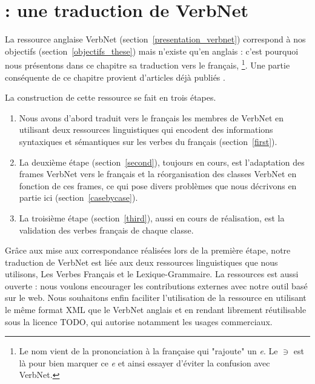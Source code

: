 \chapter{\verbenet{} : une traduction de VerbNet}
\label{ch:verbnet}

La ressource anglaise VerbNet (section~\ref{presentation_verbnet}) correspond à
nos objectifs (section~\ref{objectifs_these}) mais n'existe qu'en anglais :
c'est pourquoi nous présentons dans ce chapitre sa traduction vers le français,
\verbenet{}\footnote{Le nom vient de la prononciation à la française qui
"rajoute" un \textit{e}. Le $\ni$ est là pour bien marquer ce \textit{e} et ainsi
essayer d'éviter la confusion avec VerbNet.}. Une partie conséquente de ce
chapitre provient d'articles déjà publiés
\citep{danlos2014vers,pradet2014adapting}.

La construction de cette ressource se fait en trois étapes.
\begin{enumerate}
    \item Nous avons d'abord traduit vers le français les membres de VerbNet en
        utilisant deux ressources linguistiques qui encodent des informations
        syntaxiques et sémantiques sur les verbes du français
        (section~\ref{first}).
    \item La deuxième étape (section~\ref{second}), toujours en cours, est
        l'adaptation des frames VerbNet vers le français et la réorganisation
        des classes VerbNet en fonction de ces frames, ce qui pose divers
        problèmes que nous décrivons en partie ici (section~\ref{casebycase}).
    \item La troisième étape (section~\ref{third}), aussi en cours de
        réalisation, est la validation des verbes français de chaque classe.
\end{enumerate}

Grâce aux mise aux correspondance réalisées lors de la première étape, notre
traduction de VerbNet est liée aux deux ressources linguistiques que nous
utilisons, Les Verbes Français et le Lexique-Grammaire. La ressources est aussi
ouverte : nous voulons encourager les contributions externes avec notre outil
basé sur le web. Nous souhaitons enfin faciliter l'utilisation de la ressource
en utilisant le même format XML que le VerbNet anglais et en rendant
\verbenet{} librement réutilisable sous la licence TODO, qui autorise notamment
les usages commerciaux.

